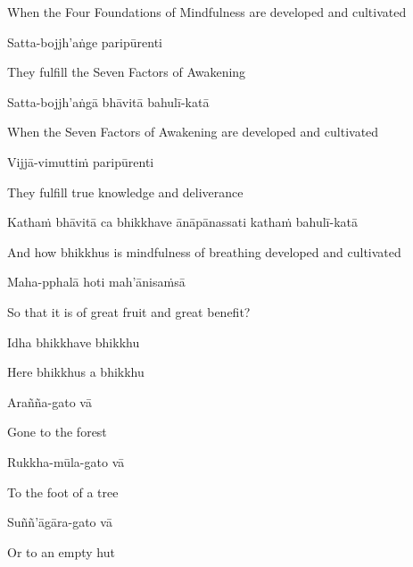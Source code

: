 \begin{english-hang}
  When the Four Foundations of Mindfulness are developed and cultivated
\end{english-hang}

Satta-bojjh'aṅge paripūrenti

\begin{english}
  They fulfill the Seven Factors of Awakening
\end{english}

Satta-bojjh'aṅgā bhāvitā bahulī-katā

\begin{english}
  When the Seven Factors of Awakening are developed and cultivated
\end{english}

Vijjā-vimuttiṁ paripūrenti

\begin{english}
  They fulfill true knowledge and deliverance
\end{english}

Kathaṁ bhāvitā ca bhikkhave ānāpānassati kathaṁ bahulī-katā

\begin{english-hang}
  And how bhikkhus is mindfulness of breathing developed and cultivated
\end{english-hang}

Maha-pphalā hoti mah'ānisaṁsā

\begin{english}
  So that it is of great fruit and great benefit?
\end{english}

Idha bhikkhave bhikkhu

\begin{english}
  Here bhikkhus a bhikkhu
\end{english}

Arañña-gato vā

\begin{english}
  Gone to the forest
\end{english}

Rukkha-mūla-gato vā

\begin{english}
  To the foot of a tree
\end{english}

Suññ'āgāra-gato vā

\begin{english}
  Or to an empty hut
\end{english}

